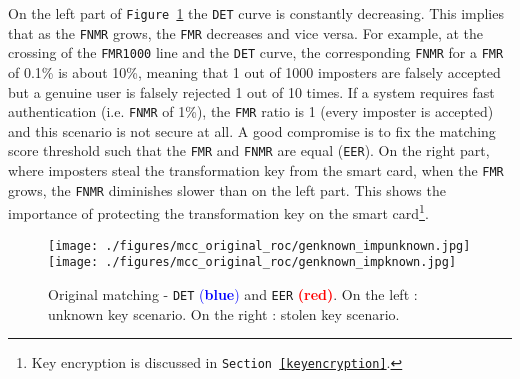 \documentclass[a4paper,12pt]{article}
\begin{document}
On the left part of \texttt{Figure \ref{tab:mcc_roc}} the \texttt{DET} curve is constantly decreasing. This implies that as the \texttt{FNMR} grows, the \texttt{FMR} decreases and vice versa. For example, at the crossing of the \texttt{FMR1000} line and the \texttt{DET} curve, the corresponding \texttt{FNMR} for a \texttt{FMR} of 0.1\% is about 10\%, meaning that 1 out of 1000 imposters are falsely accepted but a genuine user is falsely rejected 1 out of 10 times. If a system requires fast authentication (i.e. \texttt{FNMR} of 1\%), the \texttt{FMR} ratio is 1 (every imposter is accepted) and this scenario is not secure at all. A good compromise is to fix the matching score threshold such that the \texttt{FMR} and \texttt{FNMR} are equal (\texttt{EER}). On the right part, where imposters steal the transformation key from the smart card, when the \texttt{FMR} grows, the \texttt{FNMR} diminishes slower than on the left part. This shows the importance of protecting the transformation key on the smart card\footnote{Key encryption is discussed in \texttt{Section \ref{keyencryption}}.}.
\begin{figure}[!htbp]
\centering
\texttt{[image: ./figures/mcc\_original\_roc/genknown\_impunknown.jpg]}
\texttt{[image: ./figures/mcc\_original\_roc/genknown\_impknown.jpg]}
\caption{Original matching - \texttt{DET} \textcolor{blue}{(\textbf{blue})} and \texttt{EER} \textcolor{red}{\textbf{(red)}}.
On the left : unknown key scenario.
On the right : stolen key scenario.}
\label{tab:mcc_roc}
\end{figure}
\FloatBarrier
\end{document}
